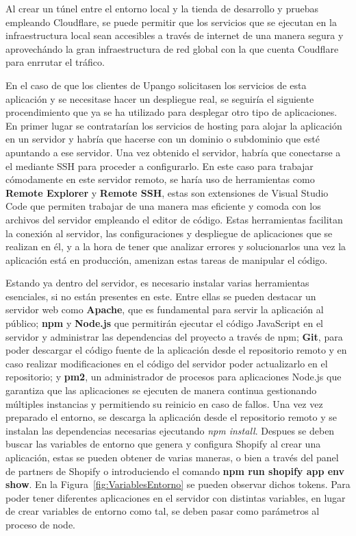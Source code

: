 \documentclass[12pt]{article}
\begin{document}
Al crear un túnel entre el entorno local y la tienda de desarrollo y pruebas empleando Cloudflare, se puede permitir que los servicios que se ejecutan en la infraestructura local
sean accesibles a través de internet de una manera segura y aprovechándo la gran infraestructura de red global con la que cuenta Coudflare para enrrutar el tráfico.

En el caso de que los clientes de Upango solicitasen los servicios de esta aplicación y se necesitase hacer un despliegue real, se seguiría el siguiente procendimiento que ya se ha utilizado para
desplegar otro tipo de aplicaciones.
En primer lugar se contratarían los servicios de hosting para alojar la aplicación en un servidor y habría que hacerse con un dominio o subdominio
que esté apuntando a ese servidor. Una vez obtenido el servidor, habría que conectarse a el mediante SSH para proceder a configurarlo. En este caso para trabajar cómodamente en este servidor remoto,
se haría uso de herramientas como \textbf{Remote Explorer} y \textbf{Remote SSH}, estas son extensiones de Visual Studio Code que permiten trabajar de una manera mas eficiente y comoda con los archivos del
servidor empleando el editor de código. Estas herramientas facilitan la conexión al servidor, las configuraciones y despliegue de aplicaciones que se realizan en él, y a la hora 
de tener que analizar errores y solucionarlos una vez la aplicación está en producción, amenizan estas tareas de manipular el código.

Estando ya dentro del servidor, es necesario instalar varias herramientas esenciales, si no están presentes en este. Entre ellas se pueden destacar un servidor web como \textbf{Apache}, que es fundamental para servir la aplicación
al público; \textbf{npm} y \textbf{Node.js} que permitirán ejecutar el código JavaScript en el servidor y administrar las dependencias del proyecto a través de npm; \textbf{Git}, para poder descargar el código fuente de la aplicación desde 
el repositorio remoto y en caso realizar modificaciones en el código del servidor poder actualizarlo en el repositorio; y \textbf{pm2}, un administrador de 
procesos para aplicaciones Node.js que garantiza que las aplicaciones se ejecuten de manera continua gestionando múltiples instancias y permitiendo su reinicio en caso de fallos.
Una vez vez preparado el entorno, se descarga la aplicación desde el repositorio remoto y se instalan las dependencias necesarias ejecutando \textit{npm install}. Despues se deben buscar las variables de entorno que genera y configura Shopify al crear una aplicación,
estas se pueden obtener de varias maneras, o bien a través del panel de partners de Shopify o introduciendo el comando \textbf{npm run shopify app env show}. En la Figura~\ref{fig:VariablesEntorno} se pueden observar dichos tokens. Para poder 
tener diferentes aplicaciones en el servidor con distintas variables, en lugar de crear variables de entorno como tal, se deben pasar como parámetros al proceso de node.
\end{document}
